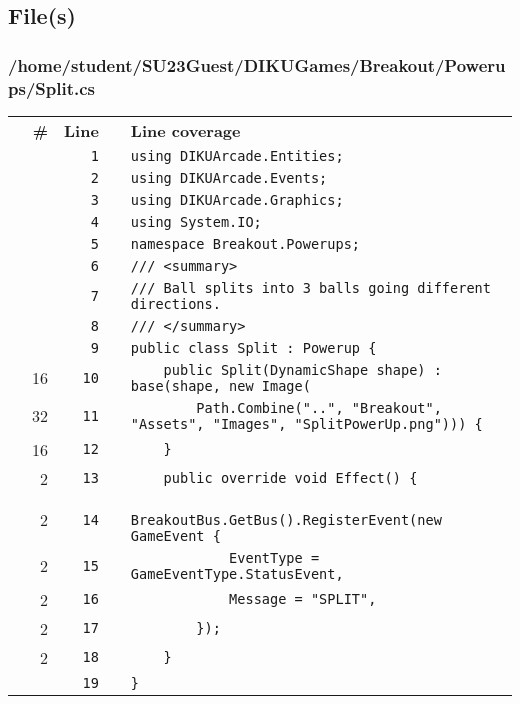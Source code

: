 \documentclass[a4paper,landscape,10pt]{article}
\begin{document}
\subsection{File(s)}
\subsubsection{/home/student/SU23Guest/DIKUGames/Breakout/Powerups/Split.cs}
\begin{longtable}[l]{lrrll}
\textbf{} & \textbf{\#} & \textbf{Line} & \textbf{} & \textbf{Line coverage}\\
\cellcolor{gray} &  & \verb~1~ & & \verb~using DIKUArcade.Entities;~\\
\cellcolor{gray} &  & \verb~2~ & & \verb~using DIKUArcade.Events;~\\
\cellcolor{gray} &  & \verb~3~ & & \verb~using DIKUArcade.Graphics;~\\
\cellcolor{gray} &  & \verb~4~ & & \verb~using System.IO;~\\
\cellcolor{gray} &  & \verb~5~ & & \verb~namespace Breakout.Powerups;~\\
\cellcolor{gray} &  & \verb~6~ & & \verb~/// <summary>~\\
\cellcolor{gray} &  & \verb~7~ & & \verb~/// Ball splits into 3 balls going different directions.~\\
\cellcolor{gray} &  & \verb~8~ & & \verb~/// </summary>~\\
\cellcolor{gray} &  & \verb~9~ & & \verb~public class Split : Powerup {~\\
\cellcolor{green} & 16 & \verb~10~ & & \verb~    public Split(DynamicShape shape) : base(shape, new Image(~\\
\cellcolor{green} & 32 & \verb~11~ & & \verb~        Path.Combine("..", "Breakout", "Assets", "Images", "SplitPowerUp.png"))) {~\\
\cellcolor{green} & 16 & \verb~12~ & & \verb~    }~\\
\cellcolor{green} & 2 & \verb~13~ & & \verb~    public override void Effect() {~\\
\cellcolor{green} & 2 & \verb~14~ & & \verb~        BreakoutBus.GetBus().RegisterEvent(new GameEvent {~\\
\cellcolor{green} & 2 & \verb~15~ & & \verb~            EventType = GameEventType.StatusEvent,~\\
\cellcolor{green} & 2 & \verb~16~ & & \verb~            Message = "SPLIT",~\\
\cellcolor{green} & 2 & \verb~17~ & & \verb~        });~\\
\cellcolor{green} & 2 & \verb~18~ & & \verb~    }~\\
\cellcolor{gray} &  & \verb~19~ & & \verb~}~\\
\end{longtable}
\newpage
\end{document}
